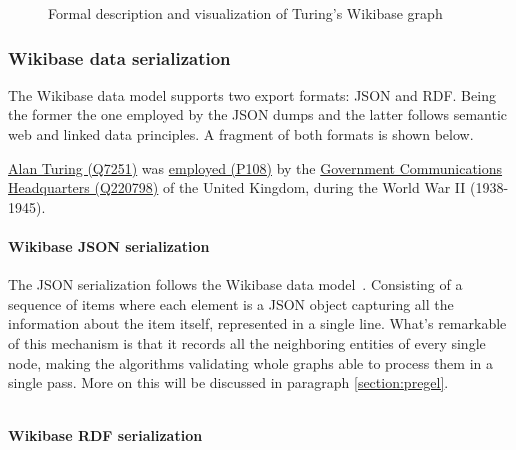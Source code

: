 

\begin{figure}[H]
    \centering
    
    \caption[Formal description and visualization of Turing's Wikibase graph]{Formal description and visualization of Turing's Wikibase graph}
\end{figure}

\subsubsection{Wikibase data serialization}
\label{section:wikibase:serialization}

The Wikibase data model supports two export formats: JSON and RDF. Being the former the one employed by the JSON dumps and the latter follows semantic web and linked data principles. A fragment of both formats is shown below.

\begin{example}
    \href{https://www.wikidata.org/wiki/Q7251}{Alan Turing (Q7251)} was \href{https://www.wikidata.org/wiki/Property:P108}{employed (P108)} by the \href{https://www.wikidata.org/wiki/Q220798}{Government Communications Headquarters (Q220798)} of the United Kingdom, during the World War II (1938-1945).
\end{example}

\paragraph{Wikibase JSON serialization}

The JSON serialization follows the Wikibase data model~\cite{https://doi.org/10.48550/arxiv.2110.11709}. Consisting of a sequence of items where each element is a JSON object capturing all the information about the item itself, represented in a single line. What's remarkable of this mechanism is that it records all the neighboring entities of every single node, making the algorithms validating whole graphs able to process them in a single pass. More on this will be discussed in paragraph \ref{section:pregel}.

\inputminted{json}{listings/serialization.json}

\paragraph[Wikibase RDF serialization]{Wikibase RDF serialization\footnotemark}

